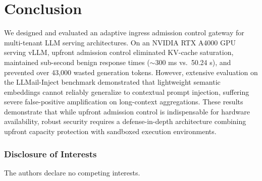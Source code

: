 \documentclass[runningheads]{article}
\begin{document}
\section{Conclusion}

We designed and evaluated an adaptive ingress admission control gateway for multi-tenant LLM serving architectures. On an NVIDIA RTX A4000 GPU serving vLLM, upfront admission control eliminated KV-cache saturation, maintained sub-second benign response times ($\sim$300 ms vs.\ 50.24 s), and prevented over 43,000 wasted generation tokens. However, extensive evaluation on the LLMail-Inject benchmark demonstrated that lightweight semantic embeddings cannot reliably generalize to contextual prompt injection, suffering severe false-positive amplification on long-context aggregations. These results demonstrate that while upfront admission control is indispensable for hardware availability, robust security requires a defense-in-depth architecture combining upfront capacity protection with sandboxed execution environments.

\subsubsection*{Disclosure of Interests}
The authors declare no competing interests.
\end{document}

